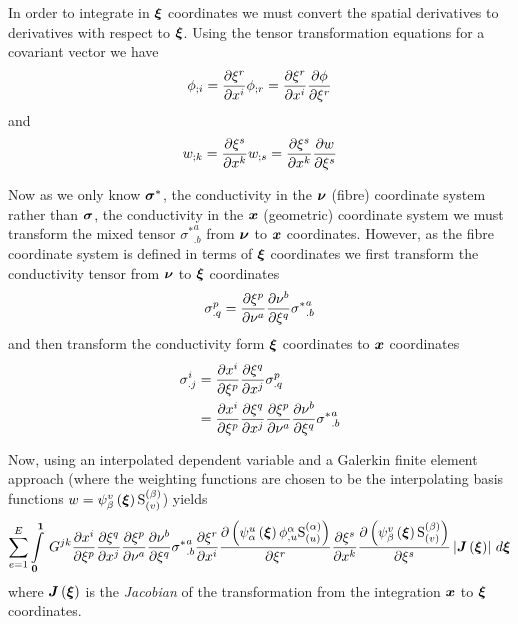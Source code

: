 In order to integrate in $\vect{\xi}$ coordinates we must convert the spatial
derivatives to derivatives with respect to $\vect{\xi}$. Using the tensor
transformation equations for a covariant vector we have
\begin{equation}  
   {\phi}_{;i} = \dfrac{\partial \xi^{r}}{\partial x^{i}}  {\phi}_{;r} = \dfrac{\partial \xi^{r}}{\partial x^{i}}  \dfrac{\partial \phi}{\partial \xi^{r}} 
\end{equation}
and 
\begin{equation}
   {w}_{;k} = \dfrac{\partial \xi^{s}}{\partial x^{k}}  {w}_{;s} = \dfrac{\partial \xi^{s}}{\partial x^{k}}  \dfrac{\partial w}{\partial \xi^{s}} 
\end{equation}

Now as we only know $\boldsymbol{\sigma}^{*}$, the conductivity in the
$\vect{\nu}$ (fibre) coordinate system rather than $\boldsymbol{\sigma}$, the
conductivity in the $\vect{x}$ (geometric) coordinate system we must transform the mixed
tensor ${\sigma^{*}}^{a}_{.b}$ from $\vect{\nu}$ to $\vect{x}$ coordinates. However, as the
fibre coordinate system is defined in terms of $\vect{\xi}$ coordinates we
first transform the conductivity tensor from $\vect{\nu}$ to $\vect{\xi}$
coordinates \ie
\begin{equation}
  \sigma^{p}_{.q}= \dfrac{\partial \xi^{p}}{\partial \nu^{a}}  \dfrac{\partial \nu^{b}}{\partial \xi^{q}} {\sigma^{*}}^{a}_{.b}
\end{equation}
and then transform the conductivity form $\vect{\xi}$ coordinates to
$\vect{x}$ coordinates \ie
\begin{equation}
  \begin{split}
    \sigma^{i}_{.j} &=  \dfrac{\partial x^{i}}{\partial \xi^{p}}  \dfrac{\partial \xi^{q}}{\partial x^{j}} {\sigma}^{p}_{.q} \\
    &=  \dfrac{\partial x^{i}}{\partial \xi^{p}}  \dfrac{\partial \xi^{q}}{\partial x^{j}}  \dfrac{\partial \xi^{p}}{\partial \nu^{a}}  \dfrac{\partial \nu^{b}}{\partial \xi^{q}} {\sigma^{*}}^{a}_{.b}
  \end{split}
\end{equation}

Now, using an interpolated dependent variable and a Galerkin finite element
approach (where the weighting functions are chosen to be the interpolating
basis functions \ie $w=\gbfn{\beta}{v}{\vect{\xi}}\gsf{(\beta)}{(v)}$) yields
\begin{equation}
  \dsum_{e=1}^{E}\gint{\vect{0}}{\vect{1}}{G^{jk}\delby{x^{i}}{\xi^{p}}
    \delby{\xi^{q}}{x^{j}}\delby{\xi^{p}} {\nu^{a}}
    \delby{\nu^{b}}{\xi^{q}}{\sigma^{*}}^{a}_{.b}\delby{\xi^{r}}{x^{i}}
    \delby{\pbrac{\gbfn{\alpha}{u}{\vect{\xi}}\nodedof{\phi}{\alpha}{u}\gsf{(\alpha)}{(u)}}}{\xi^{r}}
    \delby{\xi^{s}}{x^{k}}\delby{\pbrac{\gbfn{\beta}{v}{\vect{\xi}}\gsf{(\beta)}{(v)}}}{\xi^{s}}
    \abs{\fnof{\matr{J}}{\vect{\xi}}}}{\vect{\xi}}
\end{equation}
where $\fnof{\matr{J}}{\vect{\xi}}$ is the \emph{Jacobian} of the
transformation from the integration $\vect{x}$ to $\vect{\xi}$ coordinates.

